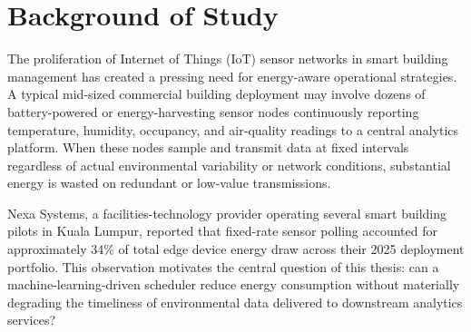 \section{Background of Study}

The proliferation of Internet of Things (IoT) sensor networks in smart building management has
created a pressing need for energy-aware operational strategies. A typical mid-sized commercial
building deployment may involve dozens of battery-powered or energy-harvesting sensor nodes
continuously reporting temperature, humidity, occupancy, and air-quality readings to a central
analytics platform. When these nodes sample and transmit data at fixed intervals regardless of
actual environmental variability or network conditions, substantial energy is wasted on redundant
or low-value transmissions.

Nexa Systems, a facilities-technology provider operating several smart building pilots in Kuala
Lumpur, reported that fixed-rate sensor polling accounted for approximately 34\% of total edge
device energy draw across their 2025 deployment portfolio. This observation motivates the central
question of this thesis: can a machine-learning-driven scheduler reduce energy consumption
without materially degrading the timeliness of environmental data delivered to downstream
analytics services?

